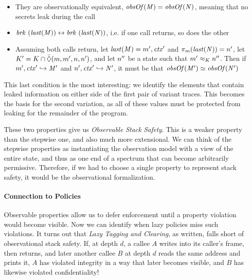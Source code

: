 \documentclass[10pt,conference]{ieeetran}%
\theoremstyle{definition}
\begin{document}
{\begin{itemize}
\item They are observationally equivalent, \(\mathit{obsOf}(\mathit{M}) = \mathit{obsOf}(\mathit{N})\),
  meaning that no secrets leak during the call
\item \(\mathit{brk} ~ (\mathit{last}(\mathit{M})) \leftrightarrow \mathit{brk} ~
(\mathit{last}(\mathit{N}))\), i.e. if one call returns, so does the other
\item Assuming both calls return, let \(\mathit{last}(\mathit{M}) = m',\mathit{ctx}'\)
  and \(\pi_m(\mathit{last}(\mathit{N})) = n'\),
  let \(K' = K \cap \bar{\Diamond}(m,m',n,n')\),
  and let \(n''\) be a state such that \(m' \approx_K n''\).
  Then if \(m',\mathit{ctx}' \hookrightarrow \mathit{M}'\) and
  \(n',\mathit{ctx}' \hookrightarrow \mathit{N}'\), it must be
  that \(\mathit{obsOf}(\mathit{M}') \simeq \mathit{obsOf}(\mathit{N}')\)
\end{itemize}

This last condition is the most interesting: we identify the elements that
contain leaked information on either side of the first pair of variant traces.
This becomes the basis for the second variation, as all of these values
must be protected from leaking for the remainder of the program.

These two properties give us
{\em Observable Stack Safety}. This is a weaker property
than the stepwise one, and also much more extensional.
We can think of the stepwise properties as instantiating
the observation model with a view of the entire state, and
thus as one end of a spectrum that can become arbitrarily permissive.
Therefore, if we had to choose a single property to represent stack safety,
it would be the observational formalization.

\medskip
\paragraph*{Connection to Policies}

Observable properties allow us to defer enforcement until a property
violation would become visible. Now we can identify when lazy policies
miss such violations. It turns out that {\em Lazy Tagging and Clearing},
as written, falls short of observational stack safety.
If, at depth \(d\), a callee \(A\) writes into its caller's
frame, then returns, and later another callee \(B\) at depth \(d\) reads the same
address and prints it, \(A\) has violated integrity in a way that later becomes visible,
and \(B\) has likewise violated confidentiality!

}
\end{document}

